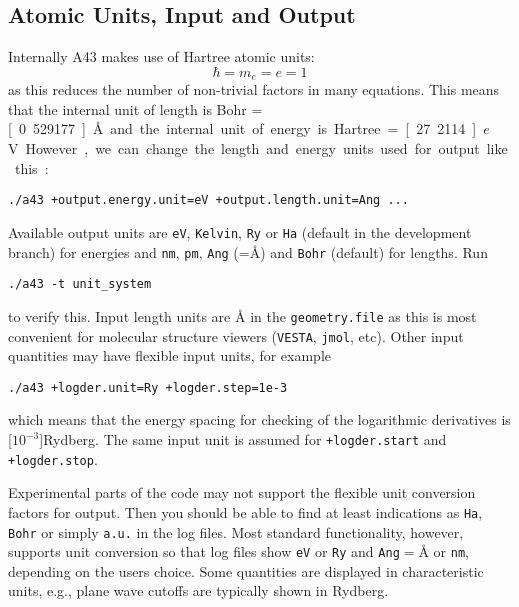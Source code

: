 \documentclass[oribibl]{llncs}
\newcommand{\ttt}[1]{\texttt{#1}}
\newcommand{\codename}{A43}
\begin{document}
\subsection{Atomic Units, Input and Output} \label{sec:units}
%
Internally \codename{} makes use of Hartree atomic units:
\begin{equation}
	\hbar = m_e = e = 1
\end{equation}
as this reduces the number of non-trivial factors in many equations.
This means that the internal unit of length is Bohr = \unit[0.529177]{\AA{}}
and the internal unit of energy is Hartree = \unit[27.2114]{$e$V}.
However, we can change the length and energy units used for output like this:
\begin{verbatim}
./a43 +output.energy.unit=eV +output.length.unit=Ang ...
\end{verbatim}
Available output units are \ttt{eV}, \ttt{Kelvin}, \ttt{Ry} or \ttt{Ha} (default in the development branch) for energies 
and \ttt{nm}, \ttt{pm}, \ttt{Ang} (=\AA) and \ttt{Bohr} (default) for lengths. Run
\begin{verbatim}
./a43 -t unit_system
\end{verbatim}
to verify this.
%
Input length units are \AA{} in the \ttt{geometry.file} as this is most convenient for molecular structure viewers
(\ttt{VESTA}, \ttt{jmol}, etc). Other input quantities may have flexible input units, for example
\begin{verbatim}
./a43 +logder.unit=Ry +logder.step=1e-3
\end{verbatim}
which means that the energy spacing for checking of the logarithmic derivatives is \unit[$10^{-3}$]{Rydberg}.
The same input unit is assumed for \ttt{+logder.start} and \ttt{+logder.stop}.


Experimental parts of the code may not support the flexible unit conversion
factors for output. Then you should be able to find at least indications as \ttt{Ha}, \ttt{Bohr} or simply \ttt{a.u.} in the log files.
Most standard functionality, however, supports unit conversion so that log files
show \ttt{eV} or \ttt{Ry} and \ttt{Ang}$ = $\AA{} or \ttt{nm}, depending on the users choice.
Some quantities are displayed in characteristic units, e.g., plane wave cutoffs are typically shown in Rydberg.
\end{document}
